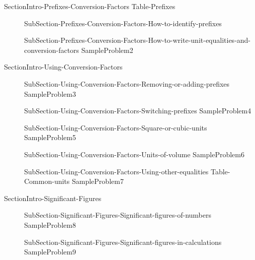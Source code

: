 \documentclass[main.tex]{subfiles}
\begin{document}
{SectionIntro-Prefixes-Conversion-Factors}
{Table-Prefixes}
\sloppy\begin{description}
\item[]{SubSection-Prefixes-Conversion-Factors-How-to-identify-prefixes}
\item[]{SubSection-Prefixes-Conversion-Factors-How-to-write-unit-equalities-and-conversion-factors}
{SampleProblem2}
\end{description}


{SectionIntro-Using-Conversion-Factors}
\sloppy\begin{description}
\item[]{SubSection-Using-Conversion-Factors-Removing-or-adding-prefixes}
{SampleProblem3}
\item[]{SubSection-Using-Conversion-Factors-Switching-prefixes}
{SampleProblem4}
\item[]{SubSection-Using-Conversion-Factors-Square-or-cubic-units}
{SampleProblem5}
\item[]{SubSection-Using-Conversion-Factors-Units-of-volume}
{SampleProblem6}
\item[]{SubSection-Using-Conversion-Factors-Using-other-equalities}
{Table-Common-units}
{SampleProblem7}
\end{description}

{SectionIntro-Significant-Figures}
\sloppy\begin{description}
\item[]{SubSection-Significant-Figures-Significant-figures-of-numbers}
{SampleProblem8}
\item[]{SubSection-Significant-Figures-Significant-figures-in-calculations}
{SampleProblem9}
\end{description}
\end{document}

